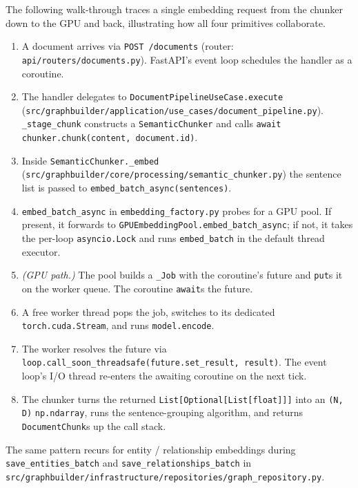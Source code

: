\documentclass[11pt,a4paper]{article}
\begin{document}
The following walk-through traces a single embedding request from the
chunker down to the GPU and back, illustrating how all four primitives
collaborate.

\begin{enumerate}[leftmargin=*,itemsep=2pt]
  \item A document arrives via
        \texttt{POST /documents} (router: \texttt{api/routers/documents.py}).
        FastAPI's event loop schedules the handler as a coroutine.
  \item The handler delegates to
        \texttt{DocumentPipelineUseCase.execute}
        (\texttt{src/graphbuilder/application/use\_cases/document\_pipeline.py}).
        \texttt{\_stage\_chunk} constructs a \texttt{SemanticChunker}
        and calls \texttt{await chunker.chunk(content, document.id)}.
  \item Inside \texttt{SemanticChunker.\_embed}
        (\texttt{src/graphbuilder/core/processing/semantic\_chunker.py})
        the sentence list is passed to
        \texttt{embed\_batch\_async(sentences)}.
  \item \texttt{embed\_batch\_async} in
        \texttt{embedding\_factory.py} probes for a GPU pool. If
        present, it forwards to
        \texttt{GPUEmbeddingPool.embed\_batch\_async}; if not, it takes
        the per-loop \texttt{asyncio.Lock} and runs \texttt{embed\_batch}
        in the default thread executor.
  \item \emph{(GPU path.)} The pool builds a \texttt{\_Job} with the
        coroutine's future and \texttt{put}s it on the worker queue.
        The coroutine \texttt{await}s the future.
  \item A free worker thread pops the job, switches to its dedicated
        \texttt{torch.cuda.Stream}, and runs \texttt{model.encode}.
  \item The worker resolves the future via
        \texttt{loop.call\_soon\_threadsafe(future.set\_result,
        result)}. The event loop's I/O thread re-enters the awaiting
        coroutine on the next tick.
  \item The chunker turns the returned \texttt{List[Optional[List[float]]]}
        into an \texttt{(N, D)} \texttt{np.ndarray}, runs the
        sentence-grouping algorithm, and returns
        \texttt{DocumentChunk}s up the call stack.
\end{enumerate}

The same pattern recurs for entity / relationship embeddings during
\texttt{save\_entities\_batch} and \texttt{save\_relationships\_batch}
in \texttt{src/graphbuilder/infrastructure/repositories/graph\_repository.py}.
\end{document}
